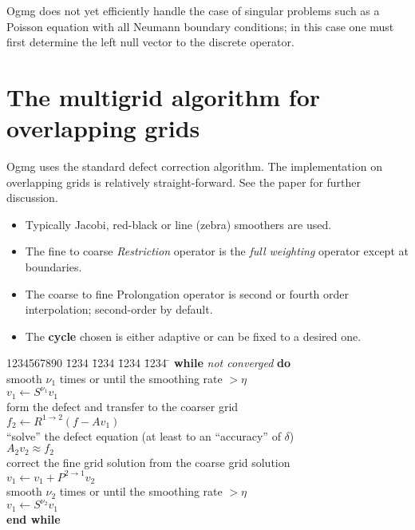 \documentclass[11pt]{article}
\begin{document}
Ogmg does not yet efficiently handle the case of singular problems such as a Poisson equation
with all Neumann boundary conditions; in this case one must first determine the left null vector
to the discrete operator. 


\section{The multigrid algorithm for overlapping grids}

Ogmg uses the standard defect correction algorithm. The implementation
on overlapping grids is relatively straight-forward. See the paper \cite{CGMG}
for further discussion.

\begin{itemize}
\item Typically Jacobi, red-black or line (zebra) smoothers are used.

\item The fine to coarse {\sl Restriction} operator is the {\it full weighting}
operator except at boundaries.

\item The coarse to fine Prolongation operator is second or fourth
order interpolation; second-order by default.

\item The {\bf cycle} chosen is either adaptive or can be fixed
to a desired one.
\end{itemize}


\begin{tabbing}
1234567890 \= 1234 \= 1234 \= 1234 \= 1234 \=  \kill  %
\> {\bf while} {\it not converged} {\bf do}                   \\
\>\>  smooth $\nu_1$ times or until the smoothing rate $> \eta$      \\
\>\>\>  $v_1 \gets S^{\nu_1} v_1$                                    \\
\>\>    form the defect and transfer to the coarser grid             \\
\>\>\>  $f_2 \gets R^{1\to2} ( f-A v_1) $                            \\
\>\>  ``solve'' the defect equation (at least to an
                ``accuracy'' of $\delta$) \\
\>\>\>    $A_2 v_2 \approx f_2$                                      \\
\>\>    correct the fine grid solution from the coarse grid solution \\
\>\>\>  $v_1 \gets v_1 + P^{2\to1} v_2 $                             \\
\>\>  smooth $\nu_2$ times or until the smoothing rate $> \eta$      \\
\>\>\>  $v_1 \gets S^{\nu_2} v_1$                                    \\
\> {\bf end while}
\end{tabbing}
\end{document}
